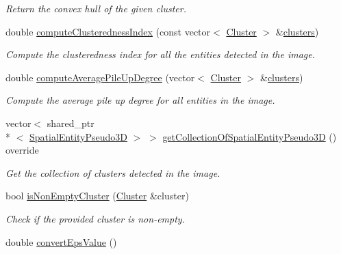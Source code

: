 \begin{DoxyCompactItemize}
\begin{DoxyCompactList}\small\item\em Return the convex hull of the given cluster. \end{DoxyCompactList}\item 
double \hyperlink{classmultiscale_1_1analysis_1_1ClusterDetector_aaa7937daf9872614e09b23cb4f6e5aa8}{compute\-Clusteredness\-Index} (const vector$<$ \hyperlink{classmultiscale_1_1analysis_1_1Cluster}{Cluster} $>$ \&\hyperlink{classmultiscale_1_1analysis_1_1ClusterDetector_aa81a8649bc743389c2fc1919d47eb5b3}{clusters})
\begin{DoxyCompactList}\small\item\em Compute the clusteredness index for all the entities detected in the image. \end{DoxyCompactList}\item 
double \hyperlink{classmultiscale_1_1analysis_1_1ClusterDetector_a1efab8446c79feb8a9285d895bb64b05}{compute\-Average\-Pile\-Up\-Degree} (vector$<$ \hyperlink{classmultiscale_1_1analysis_1_1Cluster}{Cluster} $>$ \&\hyperlink{classmultiscale_1_1analysis_1_1ClusterDetector_aa81a8649bc743389c2fc1919d47eb5b3}{clusters})
\begin{DoxyCompactList}\small\item\em Compute the average pile up degree for all entities in the image. \end{DoxyCompactList}\item 
vector$<$ shared\-\_\-ptr\\*
$<$ \hyperlink{classmultiscale_1_1analysis_1_1SpatialEntityPseudo3D}{Spatial\-Entity\-Pseudo3\-D} $>$ $>$ \hyperlink{classmultiscale_1_1analysis_1_1ClusterDetector_a6bf0ac91b81cdcf46fe8e50f6dd4c9a8}{get\-Collection\-Of\-Spatial\-Entity\-Pseudo3\-D} () override
\begin{DoxyCompactList}\small\item\em Get the collection of clusters detected in the image. \end{DoxyCompactList}\item 
bool \hyperlink{classmultiscale_1_1analysis_1_1ClusterDetector_a3322e1cf4177d40c55c1ad25b27abdc6}{is\-Non\-Empty\-Cluster} (\hyperlink{classmultiscale_1_1analysis_1_1Cluster}{Cluster} \&cluster)
\begin{DoxyCompactList}\small\item\em Check if the provided cluster is non-\/empty. \end{DoxyCompactList}\item 
double \hyperlink{classmultiscale_1_1analysis_1_1ClusterDetector_afccb86bfb93df00fff8408faea7a2651}{convert\-Eps\-Value} ()

\end{DoxyCompactItemize}
